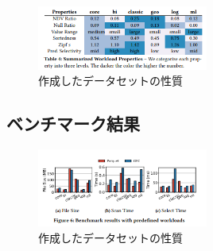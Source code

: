 \documentclass[uplatex]{jsarticle}
\theoremstyle{remark}
\begin{document}
\begin{figure}
  \centering
  \includegraphics[width=0.5\textwidth]{img/columnar_storage_format/dataset-workload.png}
  \caption{作成したデータセットの性質}
  \label{fig:dataset-workload}
\end{figure}

\subsection{ベンチマーク結果}

\begin{figure}
  \centering
  \includegraphics[width=0.5\textwidth]{img/columnar_storage_format/columnar-storage-format-result1.png}
  \caption{作成したデータセットの性質}
  \label{fig:result1}
\end{figure}
\end{document}
